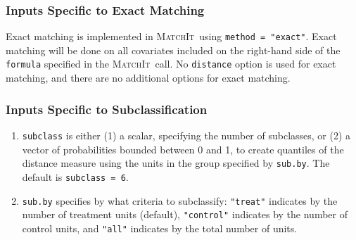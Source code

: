 \documentclass[oneside,letterpaper,titlepage]{article}
\newcommand{\MatchIt}{\textsc{MatchIt}}
\begin{document}
\subsubsection{Inputs Specific to Exact Matching}

Exact matching is implemented in \MatchIt\ using \texttt{method =
  "exact"}.  Exact matching will be done on all covariates included on
the right-hand side of the \texttt{formula} specified in the \MatchIt\
call.  No \texttt{distance} option is used for exact matching, and
there are no additional options for exact matching.

\subsubsection{Inputs Specific to Subclassification}

\begin{enumerate}
\item \texttt{subclass} is either (1) a scalar, specifying the number
  of subclasses, or (2) a vector of probabilities bounded between 0
  and 1, to create quantiles of the distance measure using the units
  in the group specified by \texttt{sub.by}.  The default is
  \texttt{subclass = 6}.
\item \texttt{sub.by} specifies by what criteria to subclassify:
  \texttt{"treat"} indicates by the number of treatment units
  (default), \texttt{"control"} indicates by the number of control
  units, and \texttt{"all"} indicates by the total number of units.
\end{enumerate}
\end{document}
